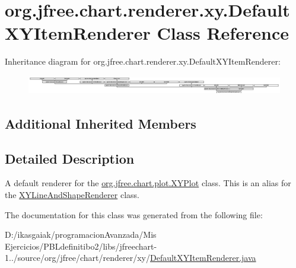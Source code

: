 \hypertarget{classorg_1_1jfree_1_1chart_1_1renderer_1_1xy_1_1_default_x_y_item_renderer}{}\section{org.\+jfree.\+chart.\+renderer.\+xy.\+Default\+X\+Y\+Item\+Renderer Class Reference}
\label{classorg_1_1jfree_1_1chart_1_1renderer_1_1xy_1_1_default_x_y_item_renderer}
Inheritance diagram for org.\+jfree.\+chart.\+renderer.\+xy.\+Default\+X\+Y\+Item\+Renderer\+:\begin{figure}[H]
\begin{center}
\leavevmode
\includegraphics[height=0.845922cm]{classorg_1_1jfree_1_1chart_1_1renderer_1_1xy_1_1_default_x_y_item_renderer}
\end{center}
\end{figure}
\subsection*{Additional Inherited Members}


\subsection{Detailed Description}
A default renderer for the \mbox{\hyperlink{classorg_1_1jfree_1_1chart_1_1plot_1_1_x_y_plot}{org.\+jfree.\+chart.\+plot.\+X\+Y\+Plot}} class. This is an alias for the \mbox{\hyperlink{classorg_1_1jfree_1_1chart_1_1renderer_1_1xy_1_1_x_y_line_and_shape_renderer}{X\+Y\+Line\+And\+Shape\+Renderer}} class. 

The documentation for this class was generated from the following file\+:\begin{DoxyCompactItemize}
\item 
D\+:/ikasgaiak/programacion\+Avanzada/\+Mis Ejercicios/\+P\+B\+Ldefinitibo2/libs/jfreechart-\/1../source/org/jfree/chart/renderer/xy/\mbox{\hyperlink{_default_x_y_item_renderer_8java}{Default\+X\+Y\+Item\+Renderer.\+java}}\end{DoxyCompactItemize}
